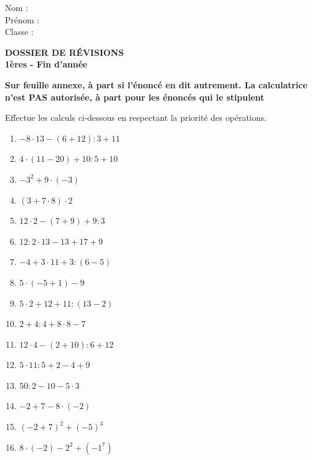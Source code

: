 \documentclass[10pt,a4paper]{article}
\begin{document}
Nom : \\
Prénom : \\ 
Classe : \\


\begin{center}
	\Huge{\textbf{DOSSIER DE RÉVISIONS}}\\
	\huge{\textbf{1ères - Fin d'année}}
\end{center}
	
\normalsize

\begin{center}
	\textbf{Sur feuille annexe, à part si l'énoncé en dit autrement. La calculatrice n'est PAS autorisée, à part pour les énoncés qui le stipulent}
\end{center}

\begin{exercise}
	Effectue les calculs ci-dessous en respectant la priorité des opérations.
			\begin{enumerate}[cols=2]
				\item $-8\cdot 13-(6+12):3+11$
				\item $4\cdot (11-20)+10:5+10$
				\item \(-3^2 + 9 \cdot (-3)\)
				\item \((3 + 7 \cdot 8) \cdot 2\)
				\item $12\cdot 2-(7+9)+9:3$
				\item $12:2\cdot 13-13+17+9$
				\item $-4+3\cdot 11+3:(6-5)$
				\item $5\cdot (-5+1)-9$
				\item $5\cdot 2+12+11:(13-2)$
				\item $2+4:4+8\cdot 8-7$
				\item $12\cdot 4-(2+10):6+12$
				\item $5\cdot 11:5+2-4+9$
				\item \(50 : 2 - 10 - 5 \cdot 3\)
				\item \(-2 + 7 - 8 \cdot (-2)\)
				\item \((-2 + 7)^2 + (-5)^3\)
				\item \(8\cdot (-2) - 2^2 + (-1^7)\)
			\end{enumerate}
\end{exercise}

\end{document}
